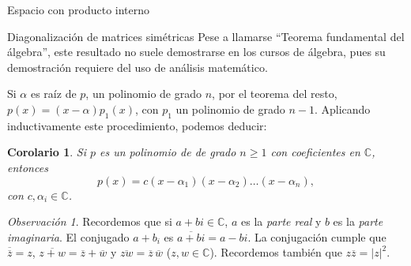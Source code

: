 \documentclass[a4paper,12pt,twoside,spanish,reqno]{amsbook}
\newtheorem{corolario}[teorema]{Corolario}
\theoremstyle{definition}
\theoremstyle{remark}
\newtheorem{obs}{Observaci\'on}[section]
\newcommand{\C}{\mathbb C}
\begin{document}
\begin{chapter}{Espacio con producto interno}
\begin{section}{Diagonalización de matrices simétricas}
    Pese a llamarse ``Teorema fundamental del álgebra'', este resultado  no suele demostrarse en los cursos de álgebra, pues su demostración requiere del uso de análisis matemático.
    
    Si $\alpha$ es raíz de $p$, un polinomio de grado $n$, por  el teorema del resto,  $p(x) = (x-\alpha)p_1(x)$, con  $p_1$ un polinomio de grado $n-1$.  Aplicando inductivamente este procedimiento, podemos deducir:
    
    \begin{corolario} Si $p$ es un polinomio de de grado $n\ge 1$ con coeficientes en $\C$,  entonces
        \begin{equation*}
            p(x)= c(x-\alpha_1)(x-\alpha_2)\ldots(x-\alpha_n),
        \end{equation*}
        con $c,\alpha_i \in \C$.
    \end{corolario}
    
    
    
    
    \begin{obs}\label{5.9} 	Recordemos que si $a+bi \in \mathbb{C}$, $a$ es la \textit{parte real} y $b$ es la \textit{parte imaginaria}. El conjugado $a+b_i$ es $\overline{a +bi} = a-bi$. La conjugación cumple que $\overline{\overline{z}} = z$, $\overline{z +w} = \overline{z}+\overline{w}$ y $\overline{z w} = \overline{z}\,\overline{w}$ ($z,w \in \mathbb{C}$). Recordemos también que $z\overline{z} = |z|^2$.
        

\end{obs}
\end{section}
\end{chapter}
\end{document}

